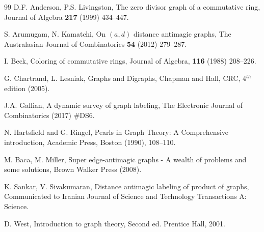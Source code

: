 \documentclass[12pt]{article}
\begin{document}
\begin{thebibliography}{99}
   D.F. Anderson, P.S. Livingston, The zero divisor
    graph of a commutative ring, Journal of Algebra
    \textbf{ 217} (1999) 434--447.

   S. Arumugam, N. Kamatchi, On $(a,d)$ distance
    antimagic graphs, The Australasian Journal of Combinatorics \textbf{54} (2012) 279--287.

   I. Beck, Coloring of commutative rings, Journal of Algebra, 
    \textbf{116} (1988) 208--226.

   G. Chartrand, L. Lesniak, Graphs and Digraphs,
    Chapman and Hall, CRC, 4$^{th}$ edition (2005).

   J.A. Gallian, A dynamic survey of graph labeling,
    The Electronic Journal of Combinatorics (2017) $\#$DS6.

   N. Hartsfield and G. Ringel, Pearls in Graph Theory:
    A Comprehensive introduction, Academic Press, Boston (1990),
    108--110.

   M. Baca, M. Miller, Super edge-antimagic
    graphs - A wealth of problems and some solutions, Brown Walker
    Press (2008).

   K. Sankar, V. Sivakumaran, Distance antimagic
    labeling of product of graphs, Communicated to Iranian Journal of
    Science and Technology Transactions A: Science.

   D. West, Introduction to graph theory, Second
    ed. Prentice Hall, 2001.
\end{thebibliography}
\end{document}
